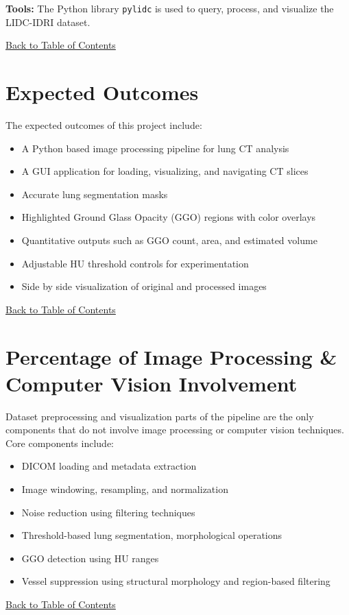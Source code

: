 \documentclass[12pt,a4paper]{article}
\begin{document}
\noindent\textbf{Tools:} The Python library \texttt{pylidc} is used to query, process, and visualize the LIDC-IDRI dataset.

\hyperref[contents]{\small Back to Table of Contents}
\newpage
\section{Expected Outcomes }

The expected outcomes of this project include:
\begin{itemize}
    \item A Python based image processing pipeline for lung CT analysis
    \item A GUI application for loading, visualizing, and navigating CT slices
    \item Accurate lung segmentation masks
    \item Highlighted Ground Glass Opacity (GGO) regions with color overlays
    \item Quantitative outputs such as GGO count, area, and estimated volume
    \item Adjustable HU threshold controls for experimentation
    \item Side by side visualization of original and processed images
\end{itemize}

\hyperref[contents]{\small Back to Table of Contents}
\newpage
\section{Percentage of Image Processing \& Computer Vision Involvement}
Dataset preprocessing and visualization parts of the pipeline are the only components that do not involve image processing or
computer vision techniques.
Core components include:
\begin{itemize}
    \item DICOM loading and metadata extraction
    \item Image windowing, resampling, and normalization
    \item Noise reduction using filtering techniques
    \item Threshold-based lung segmentation, morphological operations
    \item GGO detection using HU ranges
    \item Vessel suppression using structural morphology and region-based filtering
\end{itemize}

\hyperref[contents]{\small Back to Table of Contents}
\newpage

 

\end{document}
